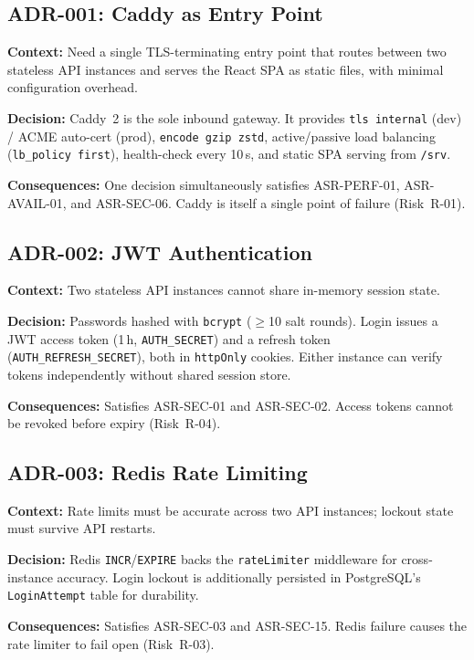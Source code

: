 \documentclass[12pt,a4paper]{article}
\begin{document}
\subsection{ADR-001: Caddy as Entry Point}

\textbf{Context:} Need a single TLS-terminating entry point that routes between two stateless
API instances and serves the React SPA as static files, with minimal configuration overhead.

\textbf{Decision:} Caddy~2 is the sole inbound gateway. It provides \texttt{tls internal}
(dev) / ACME auto-cert (prod), \texttt{encode gzip zstd}, active/passive load balancing
(\texttt{lb\_policy first}), health-check every 10\,s, and static SPA serving from
\texttt{/srv}.

\textbf{Consequences:} One decision simultaneously satisfies ASR-PERF-01, ASR-AVAIL-01,
and ASR-SEC-06. Caddy is itself a single point of failure (Risk~R-01).

\subsection{ADR-002: JWT Authentication}

\textbf{Context:} Two stateless API instances cannot share in-memory session state.

\textbf{Decision:} Passwords hashed with \texttt{bcrypt} ($\geq$10 salt rounds).
Login issues a JWT access token (1\,h, \texttt{AUTH\_SECRET}) and a refresh token
(\texttt{AUTH\_REFRESH\_SECRET}), both in \texttt{httpOnly} cookies. Either instance
can verify tokens independently without shared session store.

\textbf{Consequences:} Satisfies ASR-SEC-01 and ASR-SEC-02. Access tokens cannot be
revoked before expiry (Risk~R-04).

\subsection{ADR-003: Redis Rate Limiting}

\textbf{Context:} Rate limits must be accurate across two API instances; lockout state must
survive API restarts.

\textbf{Decision:} Redis \texttt{INCR}/\texttt{EXPIRE} backs the \texttt{rateLimiter}
middleware for cross-instance accuracy. Login lockout is additionally persisted in
PostgreSQL's \texttt{LoginAttempt} table for durability.

\textbf{Consequences:} Satisfies ASR-SEC-03 and ASR-SEC-15. Redis failure causes the rate
limiter to fail open (Risk~R-03).
\end{document}
